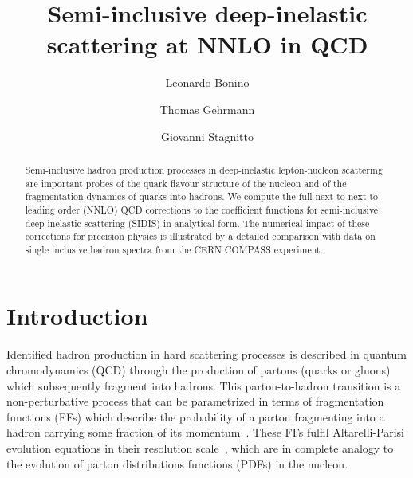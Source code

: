 \documentclass[10pt,aps,prl,twocolumn,preprintnumbers,nofootinbib]{revtex4-2}
\begin{document}

\title{Semi-inclusive deep-inelastic scattering at NNLO in QCD}%

\author{Leonardo Bonino}
%
\author{Thomas Gehrmann}
\author{Giovanni Stagnitto}
%


\begin{abstract}
  Semi-inclusive hadron production processes in deep-inelastic lepton-nucleon
  scattering are important probes of the quark flavour structure of the nucleon
  and of the fragmentation dynamics of quarks into hadrons.  We compute the full
  next-to-next-to-leading order (NNLO) QCD corrections to the coefficient
  functions for semi-inclusive deep-inelastic scattering (SIDIS) in analytical
  form.  The numerical impact of these corrections for precision physics is
  illustrated by a detailed comparison with data on single inclusive hadron
  spectra from the CERN COMPASS experiment.
\end{abstract}

\maketitle


\section{Introduction}

Identified hadron production in hard scattering processes is described in
quantum chromodynamics (QCD) through the production of partons (quarks or
gluons) which subsequently fragment into hadrons. This parton-to-hadron
transition is a non-perturbative process that can be parametrized in terms of
fragmentation functions (FFs) which describe the probability of a parton
fragmenting into a hadron carrying some fraction of its
momentum~\cite{Field:1976ve,Field:1977fa}. These FFs fulfil Altarelli-Parisi
evolution equations in their resolution scale~\cite{Altarelli:1977zs}, which are
in complete analogy to the evolution of parton distributions functions (PDFs) in
the nucleon.
\end{document}
